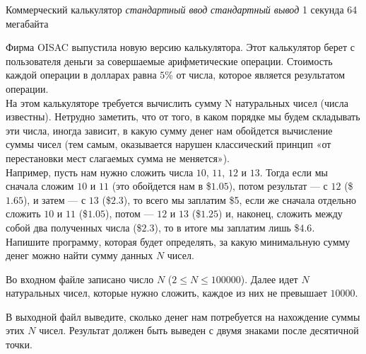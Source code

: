 \begin{problem}%
{Коммерческий калькулятор}%
{\textsl{стандартный ввод}}%
{\textsl{стандартный вывод}}%
{1 секунда}%
{64 мегабайта}%
{}

Фирма OISAC выпустила новую версию калькулятора. Этот калькулятор берет с пользователя деньги за совершаемые арифметические операции. Стоимость каждой операции в долларах равна $5$\% от числа, которое является результатом операции.\\

На этом калькуляторе требуется вычислить сумму N натуральных чисел (числа известны). Нетрудно заметить, что от того, в каком порядке мы будем складывать эти числа, иногда зависит, в какую сумму денег нам обойдется вычисление суммы чисел (тем самым, оказывается нарушен классический принцип «от перестановки мест слагаемых сумма не меняется»).\\

Например, пусть нам нужно сложить числа $10$, $11$, $12$ и $13$. Тогда если мы сначала сложим $10$ и $11$ (это обойдется нам в \$$1.05$), потом результат — с $12$ (\$$1.65$), и затем — с $13$ (\$$2.3$), то всего мы заплатим \$5, если же сначала отдельно сложить $10$ и $11$ (\$$1.05$), потом — $12$ и $13$ (\$$1.25$) и, наконец, сложить между собой два полученных числа (\$$2.3$), то в итоге мы заплатим лишь \$$4.6$.\\

Напишите программу, которая будет определять, за какую минимальную сумму денег можно найти сумму данных $N$ чисел.

\InputFile

Во входном файле записано число $N$ ($2 \le N \le 100000$). Далее идет $N$ натуральных чисел, которые нужно сложить, каждое из них не превышает $10000$.

\OutputFile

В выходной файл выведите, сколько денег нам потребуется на нахождение суммы этих $N$ чисел. Результат должен быть выведен с двумя знаками после десятичной точки.

\Examples

\begin{example}
%
%
\end{example}
\end{problem}
